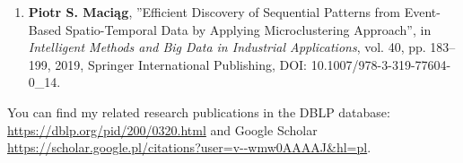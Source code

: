 \documentclass[10pt,a4paper,sans]{moderncv}        %
\begin{document}
\begin{enumerate}

     \item \textbf{Piotr S. Maci\k{a}g}, ''Efficient Discovery of Sequential Patterns from Event-Based Spatio-Temporal Data by Applying Microclustering Approach'', in \textit{Intelligent Methods and Big Data in Industrial Applications}, vol. 40, pp. 183–199, 2019, Springer International Publishing, DOI: 10.1007/978-3-319-77604-0\_14.
    



    
    
\end{enumerate}

You can find my related research publications in the DBLP database: \url{https://dblp.org/pid/200/0320.html} and Google Scholar \url{https://scholar.google.pl/citations?user=v--wmw0AAAAJ&hl=pl}.

\end{document}
